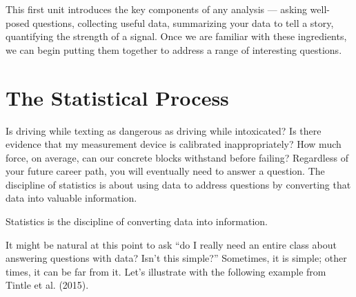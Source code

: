 \documentclass[
  letterpaper,
  DIV=11,
  numbers=noendperiod]{scrreprt}
\theoremstyle{definition}
\theoremstyle{definition}
\theoremstyle{plain}
\theoremstyle{remark}
\begin{document}
This first unit introduces the key components of any analysis --- asking
well-posed questions, collecting useful data, summarizing your data to
tell a story, quantifying the strength of a signal. Once we are familiar
with these ingredients, we can begin putting them together to address a
range of interesting questions.

\chapter{The Statistical Process}\label{sec-basics}

Is driving while texting as dangerous as driving while intoxicated? Is
there evidence that my measurement device is calibrated inappropriately?
How much force, on average, can our concrete blocks withstand before
failing? Regardless of your future career path, you will eventually need
to answer a question. The discipline of statistics is about using data
to address questions by converting that data into valuable information.

\begin{tcolorbox}[enhanced jigsaw, colbacktitle=quarto-callout-tip-color!10!white, colback=white, left=2mm, title=\textcolor{quarto-callout-tip-color}{\faLightbulb}\hspace{0.5em}{Big Idea}, toptitle=1mm, leftrule=.75mm, breakable, bottomrule=.15mm, arc=.35mm, rightrule=.15mm, toprule=.15mm, coltitle=black, opacityback=0, colframe=quarto-callout-tip-color-frame, opacitybacktitle=0.6, bottomtitle=1mm, titlerule=0mm]

Statistics is the discipline of converting data into information.

\end{tcolorbox}

It might be natural at this point to ask ``do I really need an entire
class about answering questions with data? Isn't this simple?''
Sometimes, it is simple; other times, it can be far from it. Let's
illustrate with the following example from Tintle et al. (2015).
\end{document}
